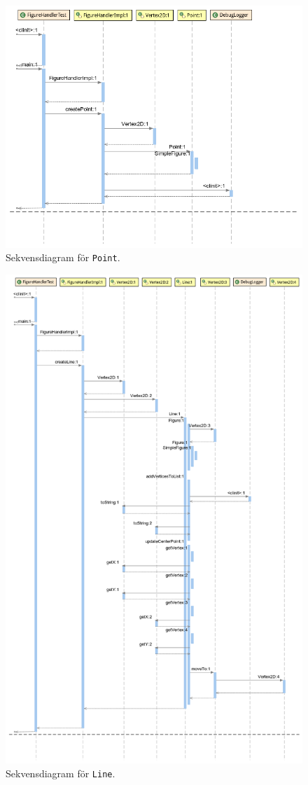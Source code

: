\begin{figure}[ht]
\centering
\includegraphics[width=\linewidth]{diagram/figureHandlerTest_Point_Sequence-Diagram.png}
\caption{Sekvensdiagram för \texttt{Point}.}
\label{fig:sekv-point}
\end{figure}

\begin{figure}[ht]
\centering
\includegraphics[width=0.8\linewidth]{diagram/figureHandlerTest_Line_Sequence-Diagram.png}
\caption{Sekvensdiagram för \texttt{Line}.}
\label{fig:sekv-line}
\end{figure}

